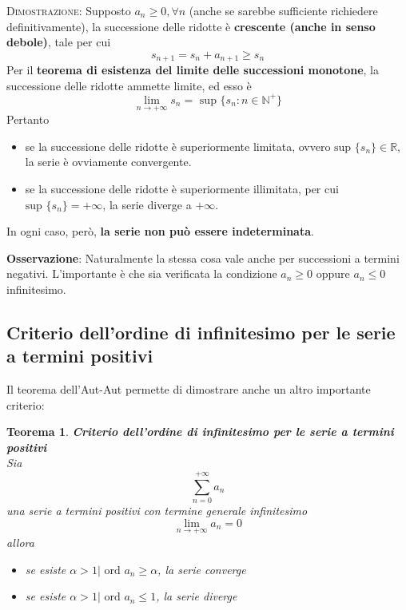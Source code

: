 \documentclass[a4paper]{extarticle}
\newtheorem{theorem}{Teorema}[section]
\begin{document}
\vspace{2em}
\noindent
\normalfont \normalsize
\textsc{Dimostrazione}: Supposto $a_n \geq 0, \forall n$ (anche se sarebbe sufficiente richiedere definitivamente), la successione delle ridotte è \textbf{crescente (anche in senso debole)}, tale per cui
\[s_{n+1}=s_n+a_{n+1} \geq s_n\]
Per il \textbf{teorema di esistenza del limite delle successioni monotone}, la successione delle ridotte ammette limite, ed esso è
\[\lim_{n \to +\infty} s_n = \text{ sup } \{s_n : n \in \mathbb{N}^+\}\]
Pertanto
\begin{itemize}
    \item se la successione delle ridotte è superiormente limitata, ovvero $\text{sup } \{s_n\} \in \mathbb{R}$, la serie è ovviamente convergente.
    \item se la successione delle ridotte è superiormente illimitata, per cui $\text{sup } \{s_n\} = +\infty$, la serie diverge a $+\infty$.
\end{itemize}
In ogni caso, però, \textbf{la serie non può essere indeterminata}.

\vspace{1em}
\noindent
\textbf{Osservazione}: Naturalmente la stessa cosa vale anche per successioni a termini negativi. L'importante è che sia verificata la condizione $a_n \geq 0$ oppure $a_n \leq 0$ infinitesimo.

\vspace{1em}
\noindent
\subsection{Criterio dell'ordine di infinitesimo per le serie a termini positivi}
Il teorema dell'Aut-Aut permette di dimostrare anche un altro importante criterio:

\begin{theorem}\textbf{Criterio dell'ordine di infinitesimo per le serie a termini positivi}\\
    Sia
    \[\sum_{n=0}^{+\infty} a_n\]
    una serie a termini positivi con termine generale infinitesimo
    \[\lim_{n \to +\infty} a_n = 0\]
    allora
    \begin{itemize}
        \item se esiste $\alpha > 1 \vert \text{ ord } a_n \geq \alpha$, la serie converge
        \item se esiste $\alpha > 1 \vert \text{ ord } a_n \leq 1$, la serie diverge
    \end{itemize}
\end{theorem}
\end{document}
